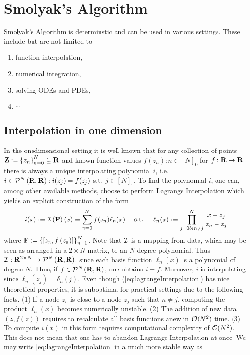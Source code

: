 \documentclass[12pt, oneside]{amsart}
\theoremstyle{definition}
\theoremstyle{remark}
\numberwithin{equation}{section}
\begin{document}
\section{Smolyak's Algorithm}


Smolyak's Algorithm is determinstic and can be used in various settings. These include but are not limited to
\begin{enumerate}
    \item function interpolation,
    \item numerical integration,
    \item solving ODEs and PDEs,
    \item \(\cdots\)
\end{enumerate}
\subsection*{Interpolation in one dimension}
In the onedimensional setting it is well known that for any collection of points \(\ZZ \defn \set{z_n}_{n=0}^N \subseteq \R\) and known function values \(f(z_n): n \in {[N]}_0\) for \(f: \R \to \R\) there is always a unique interpolating polynomial \(i\), i.e. \(i \in \pols[N]{\R, \R}: i(z_j) = f(z_j)\) s.t.\ \(j \in {[N]}_0\). To find the polynomial \(i\), one can, among other available methods, choose to perform Lagrange Interpolation which yields an explicit construction of the form
\begin{equation}\label{eq:lagrangeInterpolation}
    i(x) \defn \mathcal{I}\left(\FF\right)(x) = \sum_{n=0}^N f(z_n) \ell_n(x)\quad \text{ s.t. }\quad \ell_n(x) \defn \prod_{\substack{j = 0bin \neq j}}^N \frac{x-z_j}{z_n-z_j}
\end{equation}
where \(\FF \defn \set{\left[z_n, f\left(z_n\right)\right]}_{n=1}^{N}\). Note that \(\cI\) is a mapping from data, which may be seen as arranged in a \(2 \times N\) matrix, to an \(N\)-degree polynomial. Thus \(\cI: \R^{2 \times N} \to \pols[N]{\R,\R}\). since each basis function \(\ell_n(x)\) is a polynomial of degree \(N\). Thus, if \(f \in \pols[N]{\R, \R}\), one obtains \(i = f\). Moreover, \(i\) is interpolating since \(\ell_n(z_j) = \delta_{n}(j)\). Even though (\ref{eq:lagrangeInterpolation}) has nice theoretical properties, it is suboptimal for practical settings due to the following facts. (1) If a node \(z_n\) is close to a node \(z_j\) such that \(n \neq j\), computing the product \(\ell_n(x)\) becomes numerically unstable. (2) The addition of new data \(\left(z, f(z)\right)\) requires to recalculate all basis functions anew in \(\cO(N^2)\) time. (3) To compute \(i(x)\) in this form requires computational complexity of \(\cO(N^2)\). This does not mean that one has to abandon Lagrange Interpolation at once. We may write \cref{eq:lagrangeInterpolation} in a much more stable way as
\end{document}
